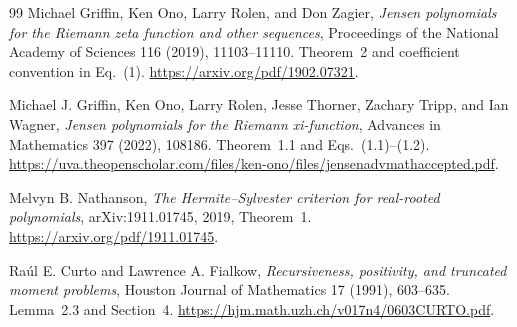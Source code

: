 \documentclass[11pt,a4paper]{article}
\numberwithin{equation}{section}
\theoremstyle{definition}
\theoremstyle{remark}
\begin{document}
\begin{thebibliography}{99}
Michael Griffin, Ken Ono, Larry Rolen, and Don Zagier,
\emph{Jensen polynomials for the Riemann zeta function and other sequences},
Proceedings of the National Academy of Sciences 116 (2019), 11103--11110.
Theorem~2 and coefficient convention in Eq.~(1).
\url{https://arxiv.org/pdf/1902.07321}.

Michael J. Griffin, Ken Ono, Larry Rolen, Jesse Thorner, Zachary Tripp,
and Ian Wagner, \emph{Jensen polynomials for the Riemann xi-function},
Advances in Mathematics 397 (2022), 108186. Theorem~1.1
and Eqs.~(1.1)--(1.2).
\url{https://uva.theopenscholar.com/files/ken-ono/files/jensenadvmathaccepted.pdf}.

Melvyn B. Nathanson, \emph{The Hermite--Sylvester criterion for
real-rooted polynomials}, arXiv:1911.01745, 2019, Theorem~1.
\url{https://arxiv.org/pdf/1911.01745}.

Ra\'ul E. Curto and Lawrence A. Fialkow,
\emph{Recursiveness, positivity, and truncated moment problems},
Houston Journal of Mathematics 17 (1991), 603--635.
Lemma~2.3 and Section~4.
\url{https://hjm.math.uzh.ch/v017n4/0603CURTO.pdf}.

\end{thebibliography}
\end{document}
